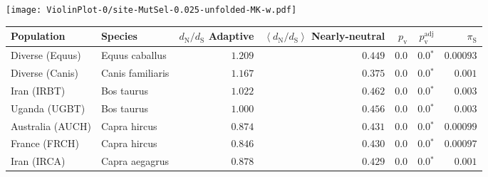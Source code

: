 \begin{center}
\begin{adjustbox}{width = 1\textwidth}
\begin{tabular}{|l|l|r|r|r|r|r|r|r|}
\bottomrule
\end{tabular}
\end{adjustbox}
\newpage
\texttt{[image: ViolinPlot-0/site-MutSel-0.025-unfolded-MK-w.pdf]} 
\begin{adjustbox}{width = 1\textwidth}
\begin{tabular}{|l|l|r|r|r|r|r|}
\toprule
                     Population &              Species & \specialcell{$d_{\mathrm{N}} / d_{\mathrm{S}}$ \\ Adaptive} & \specialcell{$\left< d_{\mathrm{N}} / d_{\mathrm{S}} \right>$ \\ Nearly-neutral} & $p_{\mathrm{v}}$ & $p_{\mathrm{v}}^{\mathrm{adj}}$ & $\pi_{\textrm{S}}$ \\
\midrule
                Diverse (Equus) &       Equus caballus &                                           $ 1.209$ &                                           $ 0.449$ &            $0.0$ &                  $\bm{0.0{^*}}$ &          $0.00093$ \\
                Diverse (Canis) &     Canis familiaris &                                           $ 1.167$ &                                           $ 0.375$ &            $0.0$ &                  $\bm{0.0{^*}}$ &           $ 0.001$ \\
                    Iran (IRBT) &           Bos taurus &                                           $ 1.022$ &                                           $ 0.462$ &            $0.0$ &                  $\bm{0.0{^*}}$ &           $ 0.003$ \\
                  Uganda (UGBT) &           Bos taurus &                                           $ 1.000$ &                                           $ 0.456$ &            $0.0$ &                  $\bm{0.0{^*}}$ &           $ 0.003$ \\
               Australia (AUCH) &         Capra hircus &                                           $ 0.874$ &                                           $ 0.431$ &            $0.0$ &                  $\bm{0.0{^*}}$ &          $0.00099$ \\
                  France (FRCH) &         Capra hircus &                                           $ 0.846$ &                                           $ 0.430$ &            $0.0$ &                  $\bm{0.0{^*}}$ &          $0.00097$ \\
                    Iran (IRCA) &       Capra aegagrus &                                           $ 0.878$ &                                           $ 0.429$ &            $0.0$ &                  $\bm{0.0{^*}}$ &           $ 0.001$ \\

\end{tabular}
\end{adjustbox}
\end{center}
